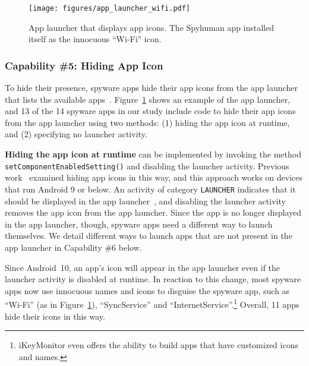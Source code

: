 \begin{figure}[t]
\centering
\texttt{[image: figures/app\_launcher\_wifi.pdf]}
\caption{App launcher that displays app icons.
The Spyhuman app installed itself as the innocuous ``Wi-Fi'' icon.}
\label{fig:app_launcher}
\end{figure}

\subsubsection*{Capability \#5: Hiding App Icon}
\label{subsubsec:hide_icon}
To hide their presence,
spyware apps hide their app icons from the app launcher that lists the available
apps~\cite{whataret1:online}. Figure~\ref{fig:app_launcher} shows an example of
the app launcher, and 13 of the 14 spyware apps in our study include code to hide their
app icons from the app launcher using two methods:
(1) hiding the app icon at runtime, and (2) specifying no launcher activity.

\textbf{Hiding the app icon at runtime} can be implemented by invoking
the method \texttt{setComponentEnabledSetting()} and disabling the
launcher activity.  Previous work~\cite{shan2018self} examined hiding
app icons in this way, and this approach works on devices that run
Android 9 or below. An activity of category \texttt{LAUNCHER}
indicates that it should be displayed in the app
launcher~\cite{IntentAn33:online}, and disabling the launcher activity
removes the app icon from the app launcher.  Since the app is no
longer displayed in the app launcher, though, spyware apps need a
different way to launch themselves. We detail different ways to launch
apps that are not present in the app launcher in Capability \#6 below.

Since Android~10, an app's icon will appear in the app launcher even
if the launcher activity is disabled at runtime. In reaction to this
change, most spyware apps now use innocuous names and icons to
disguise the spyware app, such as ``Wi-Fi'' (as in Figure~\ref{fig:app_launcher}), ``SyncService'' and
``InternetService''.\footnote{iKeyMonitor even offers the ability to
  build apps that have customized icons and names.} Overall, 11 apps hide their icons in this way.


